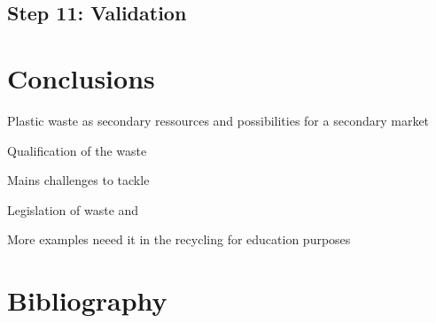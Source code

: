 \documentclass[
  11pt,
]{article}
\begin{document}
\hypertarget{step-11-validation}{%
\subsection{Step 11: Validation}\label{step-11-validation}}

\newpage

\hypertarget{conclusions}{%
\section{Conclusions}\label{conclusions}}

Plastic waste as secondary ressources and possibilities for a secondary
market

Qualification of the waste

Mains challenges to tackle

Legislation of waste and

More examples neeed it in the recycling for education purposes

\newpage

\hypertarget{bibliography}{%
\section*{Bibliography}\label{bibliography}}
\end{document}
